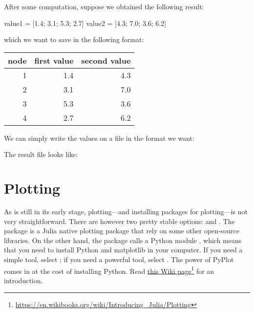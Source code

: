 After some computation, suppose we obtained the following result:
\begin{code}
value1 = [1.4; 3.1; 5.3; 2.7]
value2 = [4.3; 7.0; 3.6; 6.2]
\end{code}
\noindent which we want to save in the following format:
\begin{center}
\begin{tabular}{|r|r|r|}
\hline
node & first value & second value \\
\hline
1 & 1.4 & 4.3\\
2 & 3.1 & 7.0\\
3 & 5.3 & 3.6\\
4 & 2.7 & 6.2\\
\hline
\end{tabular}
\end{center}
We can simply write the values on a file in the format we want:
\noindent The result file looks like:
\begin{codelisting}
\end{codelisting}








\section{Plotting} \label{sec:plotting}

As \julia{} is still in its early stage, plotting---and installing packages for plotting---is not very straightforward. There are however two pretty stable options:  and . The  package is a Julia native plotting package that rely on some other open-source libraries. On the other hand, the  package calls a Python module , which means that you need to install Python and matplotlib in your computer. If you need a simple tool, select ; if you need a powerful tool, select . The power of PyPlot comes in at the cost of installing Python. Read \href{https://en.wikibooks.org/wiki/Introducing_Julia/Plotting}{this Wiki page}\footnote{\url{https://en.wikibooks.org/wiki/Introducing_Julia/Plotting}} for an introduction.

